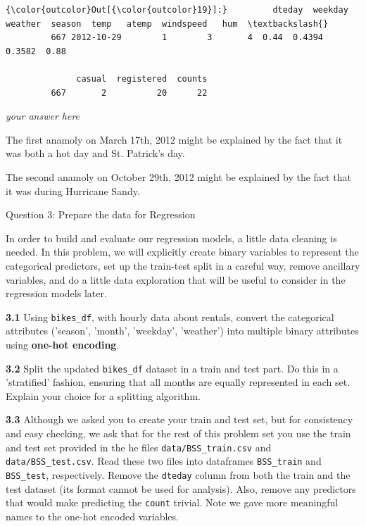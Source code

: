 \documentclass[11pt]{article}
\begin{document}
\begin{Verbatim}[commandchars=\\\{\}]
{\color{outcolor}Out[{\color{outcolor}19}]:}         dteday  weekday  weather  season  temp   atemp  windspeed   hum  \textbackslash{}
         667 2012-10-29        1        3       4  0.44  0.4394     0.3582  0.88   
         
              casual  registered  counts  
         667       2          20      22  
\end{Verbatim}
            
    \emph{your answer here}

The first anamoly on March 17th, 2012 might be explained by the fact
that it was both a hot day and St. Patrick's day.

The second anamoly on October 29th, 2012 might be explained by the fact
that it was during Hurricane Sandy.

     Question 3: Prepare the data for Regression

In order to build and evaluate our regression models, a little data
cleaning is needed. In this problem, we will explicitly create binary
variables to represent the categorical predictors, set up the train-test
split in a careful way, remove ancillary variables, and do a little data
exploration that will be useful to consider in the regression models
later.

\textbf{3.1} Using \texttt{bikes\_df}, with hourly data about rentals,
convert the categorical attributes ('season', 'month', 'weekday',
'weather') into multiple binary attributes using \textbf{one-hot
encoding}.

\textbf{3.2} Split the updated \texttt{bikes\_df} dataset in a train and
test part. Do this in a 'stratified' fashion, ensuring that all months
are equally represented in each set. Explain your choice for a splitting
algorithm.

\textbf{3.3} Although we asked you to create your train and test set,
but for consistency and easy checking, we ask that for the rest of this
problem set you use the train and test set provided in the he files
\texttt{data/BSS\_train.csv} and \texttt{data/BSS\_test.csv}. Read these
two files into dataframes \texttt{BSS\_train} and \texttt{BSS\_test},
respectively. Remove the \texttt{dteday} column from both the train and
the test dataset (its format cannot be used for analysis). Also, remove
any predictors that would make predicting the \texttt{count} trivial.
Note we gave more meaningful names to the one-hot encoded variables.
\end{document}

